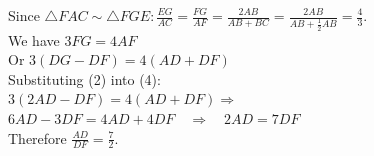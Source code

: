 \documentclass{article}
\begin{document}
Since \(\triangle F A C \sim \triangle F G E: \frac{E G}{A C}=\frac{F G}{A F}=\frac{2 A B}{A B+B C}=\frac{2 A B}{A B+\frac{1}{2} A B}=\frac{4}{3}\).\\
We have \(3 F G=4 A F\)\\
Or \(3(D G-D F)=4(A D+D F)\)\\
Substituting (2) into (4):\\
\(3(2 A D-D F)=4(A D+D F) \Rightarrow\)\\
\(6 A D-3 D F=4 A D+4 D F \quad \Rightarrow \quad 2 A D=7 D F\)\\
Therefore \(\frac{A D}{D F}=\frac{7}{2}\).
\end{document}
